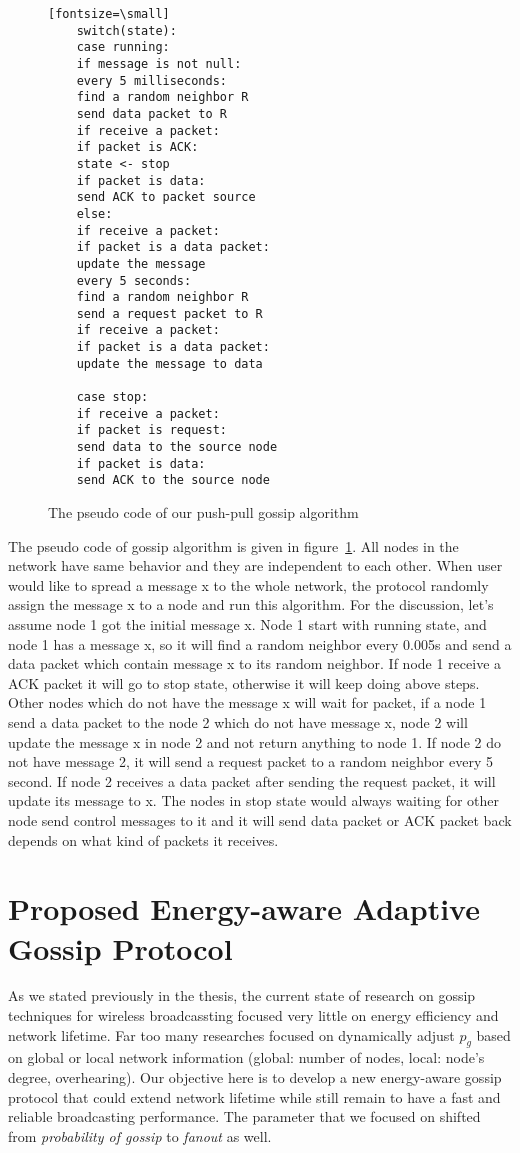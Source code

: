 \begin{figure}
	\centering
	\begin{verbatim}[fontsize=\small]
	switch(state):
	case running:
	if message is not null:
	every 5 milliseconds:
	find a random neighbor R
	send data packet to R
	if receive a packet:
	if packet is ACK:
	state <- stop
	if packet is data:
	send ACK to packet source
	else:
	if receive a packet:
	if packet is a data packet:
	update the message
	every 5 seconds:
	find a random neighbor R
	send a request packet to R
	if receive a packet:
	if packet is a data packet:
	update the message to data
	
	case stop:
	if receive a packet:
	if packet is request:
	send data to the source node
	if packet is data:
	send ACK to the source node
	\end{verbatim}
	\caption{The pseudo code of our push-pull gossip algorithm}
	\label{fig:pseudo}
\end{figure}

The pseudo code of gossip algorithm is given in figure~\ref{fig:pseudo}. All nodes in the network have same behavior and they are independent to each other. When user would like to spread a message x to the whole network, the protocol randomly assign the message x to a node and run this algorithm. For the discussion, let's assume node 1 got the initial message x. Node 1 start with running state, and node 1 has a message x, so it will find a random neighbor every 0.005s and send a data packet which contain message x to its random neighbor. If node 1 receive a ACK packet it will go to stop state, otherwise it will keep doing above steps. Other nodes which do not have the message x will wait for packet, if a node 1 send a data packet to the node 2 which do not have message x, node 2 will update the message x in node 2 and not return anything to node 1. If node 2 do not have message 2, it will send a request packet to a random neighbor every 5 second. If node 2 receives a data packet after sending the request packet, it will update its message to x. The nodes in stop state would always waiting for other node send control messages to it and it will send data packet or ACK packet back depends on what kind of packets it receives.

\section{Proposed Energy-aware Adaptive Gossip Protocol}
As we stated previously in the thesis, the current state of research on gossip techniques for wireless broadcassting focused very little on energy efficiency and network lifetime. Far too many researches focused on dynamically adjust $p_g$ based on global or local network information (global: number of nodes, local: node's degree, overhearing). Our objective here is to develop a new energy-aware gossip protocol that could extend network lifetime while still remain to have a fast and reliable broadcasting performance. The parameter that we focused on shifted from \emph{probability of gossip} to \emph{fanout} as well. 


